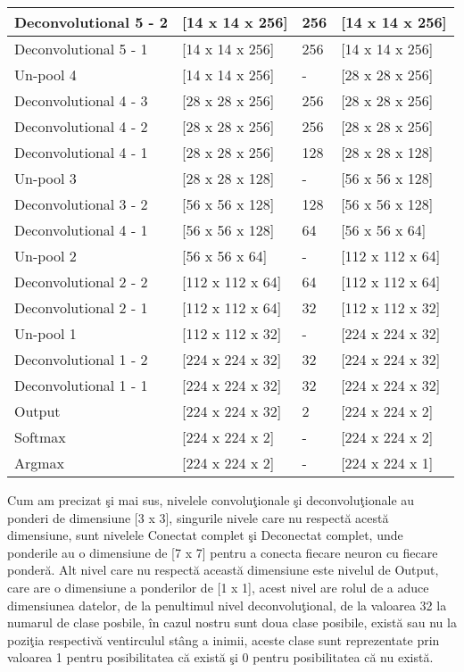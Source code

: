 \begin{center}
\begin{longtable}{|p{4cm}|p{3cm}|p{3cm}|p{3cm}|}
 \hline
 Deconvolutional 5 - 2 & [14 x 14 x 256] & 256 & [14 x 14 x 256] \\
 \hline
 Deconvolutional 5 - 1 & [14 x 14 x 256] & 256 & [14 x 14 x 256] \\
 \hline
 Un-pool 4  & [14 x 14 x 256] & - & [28 x 28 x 256] \\
 \hline
 Deconvolutional 4 - 3 & [28 x 28 x 256] & 256 & [28 x 28 x 256] \\
 \hline
 Deconvolutional 4 - 2 & [28 x 28 x 256] & 256 & [28 x 28 x 256] \\
 \hline
 Deconvolutional 4 - 1 & [28 x 28 x 256] & 128 & [28 x 28 x 128] \\
 \hline
 Un-pool 3  & [28 x 28 x 128] & - & [56 x 56 x 128] \\
 \hline
 Deconvolutional 3 - 2 & [56 x 56 x 128] & 128 & [56 x 56 x 128] \\
 \hline
 Deconvolutional 4 - 1 & [56 x 56 x 128] & 64 & [56 x 56 x 64] \\
 \hline
 Un-pool 2  & [56 x 56 x 64] & - & [112 x 112 x 64] \\
 \hline
 Deconvolutional 2 - 2 & [112 x 112 x 64] & 64 & [112 x 112 x 64] \\
 \hline
 Deconvolutional 2 - 1 & [112 x 112 x 64] & 32 & [112 x 112 x 32] \\
 \hline
  Un-pool 1  & [112 x 112 x 32] & - & [224 x 224 x 32] \\
 \hline
 Deconvolutional 1 - 2 & [224 x 224 x 32] & 32 & [224 x 224 x 32] \\
 \hline
 Deconvolutional 1 - 1 & [224 x 224 x 32] & 32 & [224 x 224 x 32] \\
 \hline
 Output & [224 x 224 x 32] & 2 & [224 x 224 x 2] \\
 \hline
 Softmax & [224 x 224 x 2] & - & [224 x 224 x 2] \\
 \hline
 Argmax & [224 x 224 x 2] & - & [224 x 224 x 1] \\
 \hline
\end{longtable}
\end{center}

Cum am precizat \c{s}i mai sus, nivelele convolu\c{t}ionale \c{s}i deconvolu\c{t}ionale au ponderi de dimensiune [3 x 3], singurile nivele care nu respect\u{a} acest\u{a} dimensiune, sunt nivelele Conectat complet \c{s}i Deconectat complet, unde ponderile au o dimensiune de [7 x 7] pentru a conecta fiecare neuron cu fiecare ponder\u{a}. Alt nivel care nu respect\u{a} aceast\u{a} dimensiune este nivelul de Output, care are o dimensiune a ponderilor de [1 x 1], acest nivel are rolul de a aduce dimensiunea datelor, de la penultimul nivel deconvolu\c{t}ional, de la valoarea 32 la numarul de clase posbile, \^{i}n cazul nostru sunt doua clase posibile, exist\u{a} sau nu la pozi\c{t}ia respectiv\u{a} ventirculul st\^{a}ng a inimii, aceste clase sunt reprezentate prin valoarea 1 pentru posibilitatea c\u{a} exist\u{a} \c{s}i 0 pentru posibilitatea c\u{a} nu exist\u{a}.

